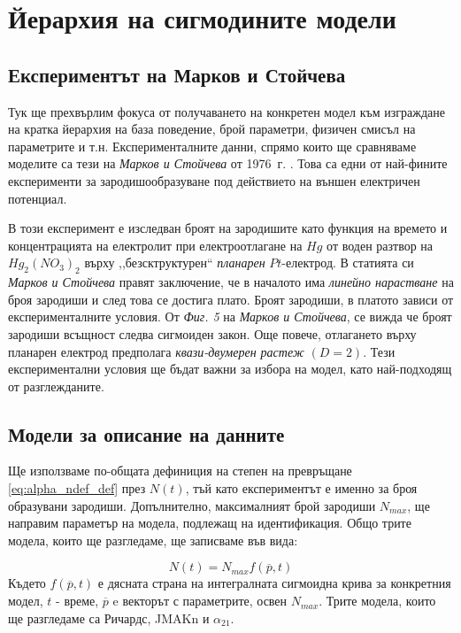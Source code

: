 \section{Йерархия на сигмодините модели}
\subsection{Експериментът на Марков и Стойчева}
Тук ще прехвърлим фокуса от получаването на конкретен модел към изграждане на кратка йерархия на база поведение, брой параметри, физичен смисъл на параметрите и т.н. Експерименталните данни, спрямо които ще сравняваме моделите са тези на \textit{Марков и Стойчева} от 1976~г. \cite{Markov1976}. Това са едни от най-фините експерименти за зародишообразуване под действието на външен електричен потенциал.

В този експеримент е изследван броят на зародишите като функция на времето и  концентрацията на електролит при електроотлагане на $Hg$ от воден разтвор на $Hg_2(NO_3)_2$ върху ,,безсктруктурен`` \textit{планарен} $Pt$-електрод. В статията си \textit{Марков и Стойчева} правят заключение, че в началото има \textit{линейно нарастване} на броя зародиши и след това се достига плато. Броят зародиши, в платото зависи от експерименталните условия. От \textit{Фиг. 5} на \textit{Марков и Стойчева}, се вижда че броят зародиши всъщност следва сигмоиден закон. Още повече, отлагането върху планарен електрод предполага \textit{квази-двумерен растеж} $(D=2)$. Тези експериментални условия ще бъдат важни за избора на модел, като най-подходящ от разглежданите.

\subsection{Модели за описание на данните}
Ще използваме по-общата дефиниция на степен на превръщане \autoref{eq:alpha_ndef_def} през $N(t)$, тъй като експериментът е именно за броя образувани зародиши. Допълнително, максималният брой зародиши $N_{max}$, ще направим параметър на модела, подлежащ на идентификация. Общо трите модела, които ще разгледаме, ще записваме във вида:

\begin{equation*}
    N(t) = N_{max} f(\overline{p}, t)
\end{equation*}
Където $f(\overline{p}, t)$ е дясната страна на интегралната сигмоидна крива за конкретния модел, $t$ - време,  $\overline{p}$ e векторът с параметрите, освен $N_{max}$.
Трите модела, които ще разгледаме са Ричардс, JMAKn и $\alpha_{21}$.
